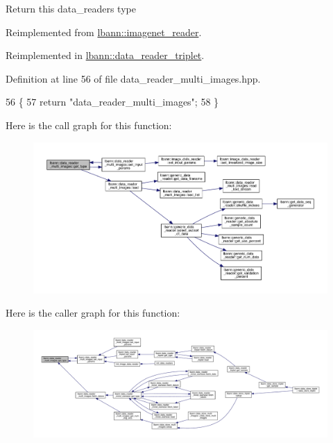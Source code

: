 Return this data\+\_\+reader\textquotesingle{}s type 

Reimplemented from \hyperlink{classlbann_1_1imagenet__reader_a0afea0db8b4286b56211842f8f1d7678}{lbann\+::imagenet\+\_\+reader}.



Reimplemented in \hyperlink{classlbann_1_1data__reader__triplet_a7ff627eed9a4671129cbf7fb9ca11871}{lbann\+::data\+\_\+reader\+\_\+triplet}.



Definition at line 56 of file data\+\_\+reader\+\_\+multi\+\_\+images.\+hpp.


\begin{DoxyCode}
56                                       \{
57     \textcolor{keywordflow}{return} \textcolor{stringliteral}{"data\_reader\_multi\_images"};
58   \}
\end{DoxyCode}
Here is the call graph for this function\+:\nopagebreak
\begin{figure}[H]
\begin{center}
\leavevmode
\includegraphics[width=350pt]{classlbann_1_1data__reader__multi__images_a9939a88a40caf7b2a27de08deca54ac1_cgraph}
\end{center}
\end{figure}
Here is the caller graph for this function\+:\nopagebreak
\begin{figure}[H]
\begin{center}
\leavevmode
\includegraphics[width=350pt]{classlbann_1_1data__reader__multi__images_a9939a88a40caf7b2a27de08deca54ac1_icgraph}
\end{center}
\end{figure}
\mbox{\label{classlbann_1_1data__reader__multi__images_afb8adef1f9ac6723d71ae5afc29b01ec}} 
